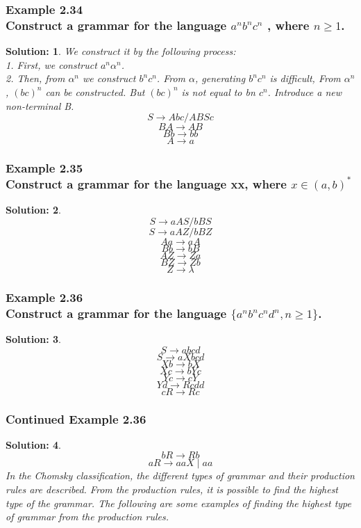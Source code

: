 \documentclass[12pt]{beamer}
\newtheorem{sol}{\textbf{Solution:}}
\begin{document}
\begin{frame}
	
	\frametitle{Example 2.34 \\ {\small Construct a grammar for the language $a^nb^nc^n$
			, where $n \geq 1$.}}
	\begin{sol}
	 We construct it by the following process:\\
	1. First, we construct $a^n\alpha^n$.\\
	2. Then, from $\alpha^n$ we construct $b^nc^n$. 
	From $\alpha$, generating $b^nc^n$ is difficult, From $\alpha^n$, $(bc)^n$
	can be constructed. But $(bc)^n$ is not equal to bn
	$c^n$. 
	Introduce a new non-terminal B.
	\[S \rightarrow Abc/ABSc\]
	\[BA \rightarrow AB\]
	\[Bb \rightarrow bb\]
	\[A \rightarrow a\]
\end{sol}
	
	
\end{frame}	


\begin{frame}
	
	\frametitle{ Example 2.35\\ {\small  Construct a grammar for the language xx, where $x \in (a, b)^* $}}
	\begin{sol}
	\[S \rightarrow aAS/bBS\]
	\[S \rightarrow aAZ/bBZ\]
	\[Aa \rightarrow aA\]
	\[Bb \rightarrow bB\]
	\[AZ \rightarrow Za\]
	\[BZ \rightarrow Zb\]
	\[Z \rightarrow \lambda \]
\end{sol}
	
	
\end{frame}	


\begin{frame}
	
	\frametitle{Example 2.36 \\{\small  Construct a grammar for the language $\{a^nb^nc^nd^n, n\geq1\}$.}}
	\begin{sol}
	\[S \rightarrow abcd\]
	\[S \rightarrow aXbcd\]
	\[Xb \rightarrow bX\]
	\[Xc \rightarrow bYc\]
	\[Yc \rightarrow cY\]
	\[Yd \rightarrow Rcdd\]
	\[cR \rightarrow Rc\]

\end{sol}
	
	
\end{frame}	


\begin{frame}
	
	\frametitle{Continued Example 2.36}
	\begin{sol}
			\[bR \rightarrow Rb\]
		\[aR \rightarrow aaX \mid aa\]
		In the Chomsky classification, the different types of grammar and their production rules are
	described. 
	From the production rules, it is possible to find the highest type of the grammar. The following
	are some 
	examples of finding the highest type of grammar from the production rules.\\
	\end{sol}
	
\end{frame}	
\end{document}
